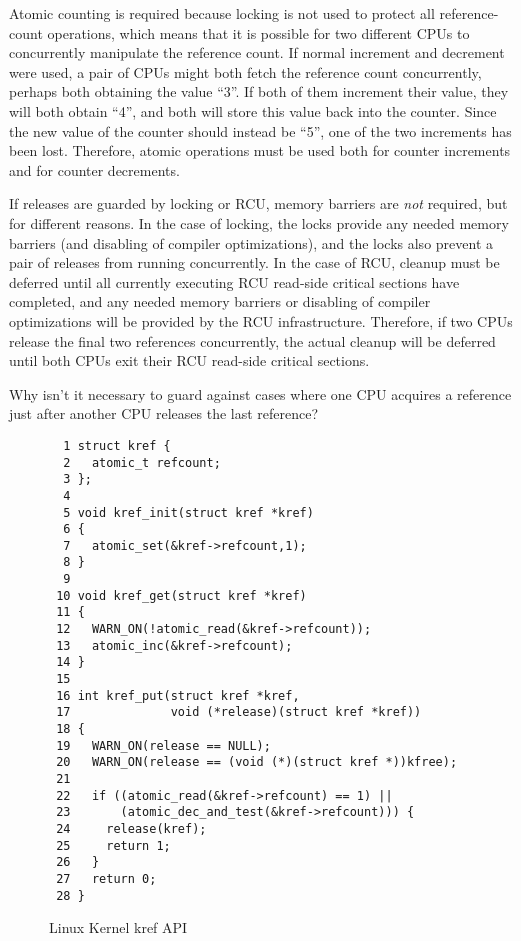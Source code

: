 Atomic counting is required
because locking is not used to protect all reference-count operations,
which means that it is possible for two different CPUs to concurrently
manipulate the reference count.
If normal increment and decrement were used, a pair of CPUs might both
fetch the reference count concurrently, perhaps both obtaining
the value ``3''.
If both of them increment their value, they will both obtain ``4'',
and both will store this value back into the counter.
Since the new value of the counter should instead be ``5'', one
of the two increments has been lost.
Therefore, atomic operations must be used both for counter increments
and for counter decrements.

If releases are guarded by locking or RCU,
memory barriers are \emph{not} required, but for different reasons.
In the case of locking, the locks provide any needed memory barriers
(and disabling of compiler optimizations), and the locks also
prevent a pair of releases from running concurrently.
In the case of RCU, cleanup must be deferred until all currently
executing RCU read-side critical sections have completed, and
any needed memory barriers or disabling of compiler optimizations
will be provided by the RCU infrastructure.
Therefore, if two CPUs release the final two references concurrently,
the actual cleanup will be deferred until both CPUs exit their
RCU read-side critical sections.

\QuickQuiz{}
	Why isn't it necessary to guard against cases where one CPU
	acquires a reference just after another CPU releases the last
	reference?
 \QuickQuizEnd

\begin{figure}[htbp]
{ \scriptsize
\begin{verbatim}
  1 struct kref {
  2   atomic_t refcount;
  3 };
  4 
  5 void kref_init(struct kref *kref)
  6 {
  7   atomic_set(&kref->refcount,1);
  8 }
  9 
 10 void kref_get(struct kref *kref)
 11 {
 12   WARN_ON(!atomic_read(&kref->refcount));
 13   atomic_inc(&kref->refcount);
 14 }
 15 
 16 int kref_put(struct kref *kref,
 17              void (*release)(struct kref *kref))
 18 {
 19   WARN_ON(release == NULL);
 20   WARN_ON(release == (void (*)(struct kref *))kfree);
 21 
 22   if ((atomic_read(&kref->refcount) == 1) ||
 23       (atomic_dec_and_test(&kref->refcount))) {
 24     release(kref);
 25     return 1;
 26   }
 27   return 0;
 28 }
\end{verbatim}
}
\caption{Linux Kernel kref API}
\label{fig:defer:Linux Kernel kref API}
\end{figure}

